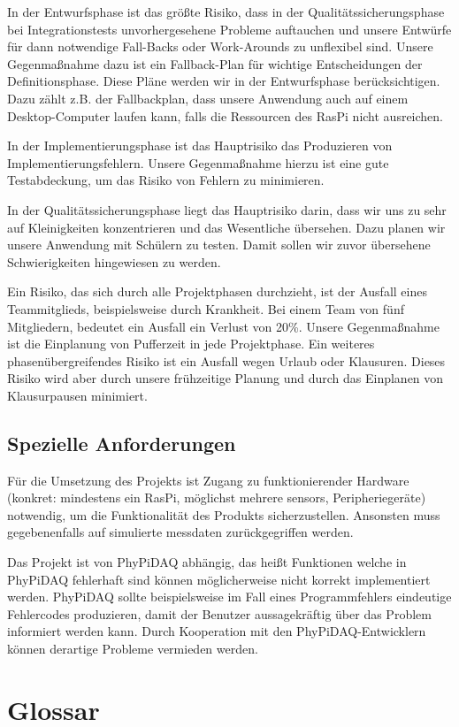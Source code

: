 \documentclass[parskip=full]{scrartcl}
\begin{document}
In der Entwurfsphase ist das größte Risiko, dass in der Qualitätssicherungsphase bei Integrationstests unvorhergesehene Probleme auftauchen und unsere Entwürfe für dann notwendige Fall-Backs oder Work-Arounds zu unflexibel sind. Unsere Gegenmaßnahme dazu ist ein Fallback-Plan für wichtige Entscheidungen der Definitionsphase. Diese Pläne werden wir in der Entwurfsphase berücksichtigen. Dazu zählt z.B. der Fallbackplan, dass unsere Anwendung auch auf einem Desktop-Computer laufen kann, falls die Ressourcen des \gls{RasPi} nicht ausreichen.
 
In der Implementierungsphase ist das Hauptrisiko das Produzieren von Implementierungsfehlern. Unsere Gegenmaßnahme hierzu ist eine gute Testabdeckung, um das Risiko von Fehlern zu minimieren.
 
In der Qualitätssicherungsphase liegt das Hauptrisiko darin, dass wir uns zu sehr auf Kleinigkeiten konzentrieren und das Wesentliche 
übersehen. Dazu planen wir unsere Anwendung mit Schülern zu testen. Damit sollen wir zuvor übersehene Schwierigkeiten hingewiesen zu werden.

Ein Risiko, das sich durch alle Projektphasen durchzieht, ist der Ausfall eines Teammitglieds, beispielsweise durch Krankheit. Bei einem Team von fünf Mitgliedern, bedeutet ein Ausfall ein Verlust von 20\%. Unsere Gegenmaßnahme ist die Einplanung von Pufferzeit in jede Projektphase. Ein weiteres phasenübergreifendes Risiko ist ein Ausfall wegen Urlaub oder Klausuren. Dieses Risiko wird aber durch unsere frühzeitige Planung und durch das Einplanen von Klausurpausen minimiert.

\subsection{Spezielle Anforderungen}\label{entwicklungsumgebung}

Für die Umsetzung des Projekts ist Zugang zu funktionierender Hardware (konkret: mindestens ein \gls{RasPi}, möglichst mehrere \glspl{sensor}, Peripheriegeräte) notwendig, um die Funktionalität des Produkts sicherzustellen.\newline
Ansonsten muss gegebenenfalls auf simulierte \gls{messdaten} zurückgegriffen werden.

Das Projekt ist von \gls{PhyPiDAQ} abhängig, das heißt Funktionen welche in PhyPiDAQ fehlerhaft sind können möglicherweise nicht korrekt implementiert werden. PhyPiDAQ sollte beispielsweise im Fall eines Programmfehlers eindeutige Fehlercodes produzieren, damit der Benutzer aussagekräftig über das Problem informiert werden kann.\newline
Durch Kooperation mit den PhyPiDAQ-Entwicklern können derartige Probleme vermieden werden.

\clearpage
\section{Glossar}\label{glossar}

\renewcommand*{\glossarysection}[2][]{}	%
\printnoidxglossaries				%
\end{document}
